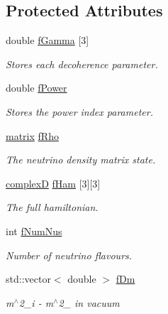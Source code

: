 \subsection*{Protected Attributes}
\begin{DoxyCompactItemize}
\item 
double \hyperlink{classOscProb_1_1PMNS__Deco_ae2f30ac9f8b25344959f1698616d337a}{f\+Gamma} \mbox{[}3\mbox{]}
\begin{DoxyCompactList}\small\item\em Stores each decoherence parameter. \end{DoxyCompactList}\item 
double \hyperlink{classOscProb_1_1PMNS__Deco_a19fdcdf9a8b2bd9677f72ca1fd77dc3e}{f\+Power}
\begin{DoxyCompactList}\small\item\em Stores the power index parameter. \end{DoxyCompactList}\item 
\hyperlink{classOscProb_1_1PMNS__Deco_a77b4e0c041b6268910a270be0f5387c9}{matrix} \hyperlink{classOscProb_1_1PMNS__Deco_a0488d62b4ef4cf5b43425769f5fcdbdf}{f\+Rho}
\begin{DoxyCompactList}\small\item\em The neutrino density matrix state. \end{DoxyCompactList}\item 
\hyperlink{EigenPoint_8h_a67ca8e107e20610c3fff78d5e726ece0}{complexD} \hyperlink{classOscProb_1_1PMNS__Fast_a94286a881bc53dd512a89d548346b611}{f\+Ham} \mbox{[}3\mbox{]}\mbox{[}3\mbox{]}
\begin{DoxyCompactList}\small\item\em The full hamiltonian. \end{DoxyCompactList}\item 
int \hyperlink{classOscProb_1_1PMNS__Base_a24bb74bed63569dfe88b18fa6a08060e}{f\+Num\+Nus}
\begin{DoxyCompactList}\small\item\em Number of neutrino flavours. \end{DoxyCompactList}\item 
std\+::vector$<$ double $>$ \hyperlink{classOscProb_1_1PMNS__Base_a406a31c3b5d620e5a0cace5b411f9f70}{f\+Dm}
\begin{DoxyCompactList}\small\item\em m$^\wedge$2\+\_\+i -\/ m$^\wedge$2\+\_ in vacuum \end{DoxyCompactList}\item 

\end{DoxyCompactItemize}
